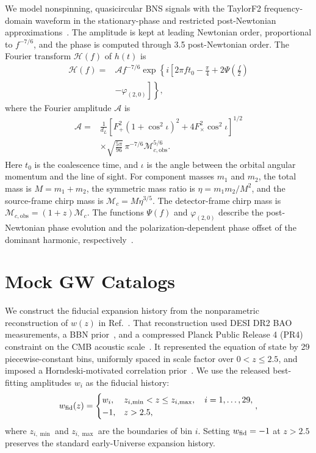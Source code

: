 \documentclass[
  aps,
  prd,
  twocolumn,
  nofootinbib,
  superscriptaddress,
  floatfix,
  longbibliography
]{revtex4-2}
\begin{document}
We model nonspinning, quasicircular BNS signals with the TaylorF2
frequency-domain waveform in the stationary-phase and restricted
post-Newtonian approximations~\cite{Blanchet2014}. The amplitude is kept at
leading Newtonian order, proportional to $f^{-7/6}$, and the phase is
computed through 3.5 post-Newtonian order. The Fourier transform
$\mathcal{H}(f)$ of $h(t)$ is
\begin{equation}
\begin{aligned}
\mathcal{H}(f)= & \mathcal{A} f^{-7 / 6} \exp \left\{i \left[2 \pi f t_0-\frac{\pi}{4}+2 \Psi\left(\frac{f}{2}\right)\right.\right. \\
& \left.\left.-\varphi_{(2,0)}\right]\right\},
\end{aligned}
\end{equation}
where the Fourier amplitude $\mathcal{A}$ is
\begin{equation}
\begin{aligned}
\mathcal{A}= & \frac{1}{d_L}\left[F_{+}^2\left(1+\cos ^2\iota\right)^2+4F_{\times}^2\cos ^2\iota\right]^{1/2} \\
& \times \sqrt{\frac{5 \pi}{96}}\,\pi^{-7 / 6}\mathcal{M}_{c,\mathrm{obs}}^{5 / 6}.
\end{aligned}
\end{equation}
Here $t_0$ is the coalescence time, and $\iota$ is the angle between the
orbital angular momentum and the line of sight. For component masses $m_1$
and $m_2$, the total mass is $M=m_1+m_2$, the symmetric mass ratio is
$\eta=m_1m_2/M^2$, and the source-frame chirp mass is
$\mathcal{M}_c=M\eta^{3/5}$. The detector-frame chirp mass is
$\mathcal{M}_{c,\mathrm{obs}}=(1+z)\mathcal{M}_c$. The functions $\Psi(f)$
and $\varphi_{(2,0)}$ describe the post-Newtonian phase evolution and the
polarization-dependent phase offset of the dominant harmonic,
respectively~\cite{Zhao2011,Sathyaprakash_2009}.


\section{Mock GW Catalogs}
\label{sec:mock_data}
We construct the fiducial expansion history from the nonparametric
reconstruction of $w(z)$ in Ref.~\cite{Gu_2025}. That reconstruction used
DESI DR2 BAO measurements, a BBN prior~\cite{Schoneberg2026}, and a
compressed Planck Public Release 4 (PR4) constraint on the CMB acoustic
scale~\cite{Rosenberg_2022}. It represented the equation of state by 29
piecewise-constant bins, uniformly spaced in scale factor over
$0<z\leq2.5$, and imposed a Horndeski-motivated correlation
prior~\cite{Raveri2017}. We use the released best-fitting amplitudes $w_i$
as the fiducial history:
\begin{equation}
w_{\rm fid}(z)=
\begin{cases}
w_i,
& z_{i,\min}<z\leq z_{i,\max},
\quad i=1,\ldots,29,\\
-1,
& z>2.5,
\end{cases},
\label{eq:w_fid_binned}
\end{equation}
where $z_{i,\min}$ and $z_{i,\max}$ are the boundaries of bin $i$. Setting
$w_{\rm fid}=-1$ at $z>2.5$ preserves the standard early-Universe
expansion history.
\end{document}
